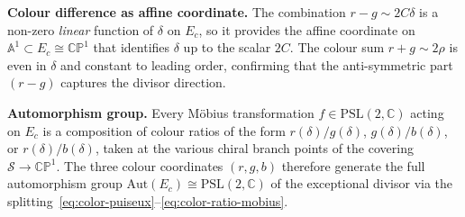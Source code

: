 \begin{remark}
\medskip
\noindent\textbf{Colour difference as affine coordinate.}\;
The combination $r - g \sim 2C\delta$ is a non-zero \emph{linear}
function of $\delta$ on $E_c$, so it provides the affine coordinate
on $\mathbb{A}^1 \subset E_c \cong \mathbb{CP}^1$ that identifies
$\delta$ up to the scalar $2C$.  The colour sum $r + g \sim 2\rho$ is
even in $\delta$ and constant to leading order, confirming that the
anti-symmetric part $(r-g)$ captures the divisor direction.

\medskip
\noindent\textbf{Automorphism group.}\;
Every M\"obius transformation $f \in \mathrm{PSL}(2,\mathbb{C})$ acting
on $E_c$ is a composition of colour ratios of the form
$r(\delta)/g(\delta)$, $g(\delta)/b(\delta)$, or $r(\delta)/b(\delta)$,
taken at the various chiral branch points of the covering
$\mathcal{S} \to \mathbb{CP}^1$.  The three colour coordinates $(r, g, b)$
therefore generate the full automorphism group
$\mathrm{Aut}(E_c) \cong \mathrm{PSL}(2,\mathbb{C})$ of the exceptional
divisor via the splitting~\eqref{eq:color-puiseux}--\eqref{eq:color-ratio-mobius}.
\end{remark}

